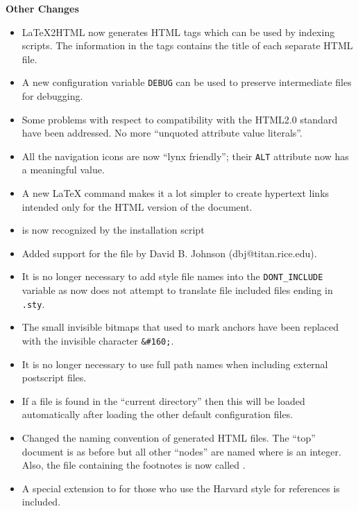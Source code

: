 \begin{htmllist}
\item[\textbf{Other Changes}] \hfill
\begin{itemize}
\item LaTeX2HTML now generates  HTML tags which can be used
by indexing scripts.
The information in the  tags
contains
the title of each separate HTML file. 
\item A new configuration variable \texttt{DEBUG} can be used to preserve
intermediate files for debugging. 
\item Some problems with respect to compatibility with the HTML2.0 
standard have been addressed. No more ``unquoted attribute value literals''.
\item All the navigation icons are now ``lynx friendly''; their
\texttt{ALT} attribute now has a meaningful value.
\item A new LaTeX command  makes it a lot simpler
to create hypertext links intended only for the HTML version of
the document.
\item {} is now recognized by the installation script
\item Added support for the  file by 
David B. Johnson (dbj@titan.rice.edu).
\item It is no longer necessary to add style file names into the 
\texttt{DONT\_INCLUDE} variable as \latextohtml{} now does not
attempt to translate file included files ending in \texttt{.sty}.
\item The small invisible bitmaps that used to mark anchors have been
replaced with the invisible character \verb|&#160;|.
\item It is no longer necessary to use full path names when
including external postscript files.
\item If a file  is found in the ``current
directory'' then this will be loaded automatically after loading the
other default configuration files.
\item Changed the naming convention of generated HTML files. The
``top'' document is  as before but all other ``nodes''
are named  where  is an integer. Also, the file
containing
the footnotes is now called .
\item A special extension to \latextohtml{} for those who use the 
Harvard style for references is included.
\end{itemize}
\end{htmllist}


